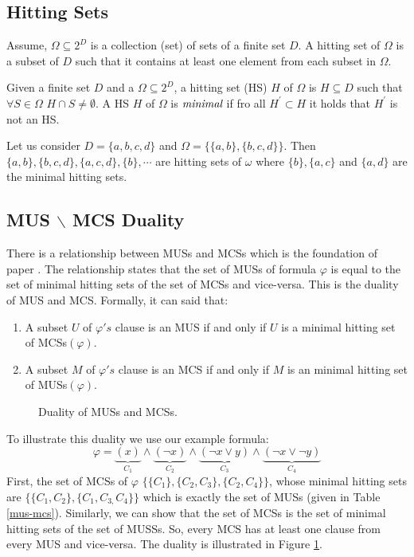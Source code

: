 \subsection{Hitting Sets}
Assume, $\Omega \subseteq 2^{D}$ is a collection (set) of sets of a finite set $D$. A hitting set of $\Omega$ is a subset of $D$ such that it contains at least one element from each subset in $\Omega$.
\begin{definition}
Given a finite set $D$ and a $\Omega \subseteq 2^{D}$, a hitting set (HS) $H$ of $\Omega$ is $H\subseteq D$ such that $\forall S\in \Omega$ $H\cap S\neq \emptyset$. A HS $H$ of $\Omega$ is $\emph{minimal}$ if fro all $H^{\prime}\subset H$ it holds that $H^{\prime}$ is not an HS.
\end{definition}
\begin{example}
Let us consider $D=\{a, b,c,d\}$ and $\Omega=\{\{a, b\}, \{b, c, d\}\}$. Then $\{a,b\}, \{b,c,d\}, \{a,c,d\}, \{b\},\cdots$ are hitting sets of $\omega$ where $\{b\}, \{a,c\} $ and $ \{a,d\}$ are the minimal hitting sets.	
\end{example}
\subsection{MUS $\backslash$ MCS Duality}
There is a relationship between MUSs and MCSs which is the foundation of paper \cite{karem}. The relationship states that the set of MUSs of formula $\varphi$ is equal to the set of minimal hitting sets of the set of MCSs and vice-versa. This is the duality of MUS and MCS. Formally, it can said that:
\begin{enumerate}
	\item A subset $U$ of $\varphi 's$ clause is an MUS if and only if $U$ is a minimal hitting set of MCSs$(\varphi)$.
	\item A subset $M$ of $\varphi 's$ clause is an MCS if and only if $M$ is an minimal hitting set of MUSs$(\varphi)$.
\end{enumerate}
\begin{figure}[htb] %
	\begin{center}
		
	\end{center}
	\caption{Duality of MUSs and MCSs.}
	\label{fig:graph}
\end{figure}

\begin{example}
		To illustrate this duality we use our example formula: $$\varphi=\underbrace{(x)}\limits_{C_{1}}\wedge\underbrace{(\neg x)}\limits_{C_{2}}\wedge\underbrace{(\neg x\vee y)}\limits_{C_{3}}\wedge\underbrace{(\neg x \vee \neg y)}\limits_{C_{4}}$$ First, the set of MCSs of $\varphi$  $\{\{C_{1}\}, \{C_{2}, C_{3}\}, \{C_{2}, C_{4}\}\}$, whose minimal hitting sets are $\{\{C_{1}, C_{2}\}, \{C_{1}, C_{3,} C_{4}\}\}$ which is exactly the set of MUSs (given in Table \ref{mus-mcs}). Similarly, we can show that the set of MCSs is the set of minimal hitting sets of the set of MUSSs. So, every MCS has at least one clause from every MUS and vice-versa. The duality is illustrated in Figure \ref{fig:graph}.
	
\end{example}
